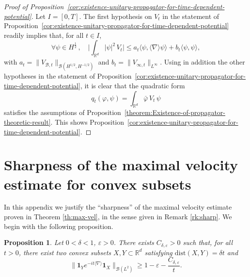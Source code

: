 \documentclass[12pt]{article}
\newcommand{\R}{\mathbb{R}}
\newcommand{\jnabla}{{\langle\nabla\rangle}}
\theoremstyle{plain}
\newtheorem{prop}[theo]{Proposition}
\begin{document}
\begin{proof}[Proof of Proposition~\ref{cor:existence-unitary-propagator-for-time-dependent-potential}]Let $I=[0,T]$. 
 The first hypothesis on $V_t$ in the statement of Proposition~\ref{cor:existence-unitary-propagator-for-time-dependent-potential} readily implies that, for all $t\in I$,
    \begin{equation}\label{eqn:condition-kato-reillich}
        \forall\psi\in H^{\frac12}\,, \quad \Big|\int_{\mathbb{R}^d} |\psi|^2  \, V_t \Big| \leq a_t\big\langle \psi, \jnabla\psi\big\rangle+b_t\langle\psi,\psi\rangle,
    \end{equation}
    with $a_t=\|V_{\mathcal{B},t}\|_{\mathcal{B}(H^{1/2},H^{-1/2})}$ and $b_t=\|V_{\infty,t}\|_{L^\infty}$. 
    Using in addition the other hypotheses in the statement of Proposition~\ref{cor:existence-unitary-propagator-for-time-dependent-potential}, it is clear that the quadratic form
    \begin{equation}
        q_t(\varphi,\psi)=\int_{\mathbb{R}^d} \bar\varphi \, V_t \, \psi
    \end{equation}
    satisfies the assumptions of Proposition~\ref{theorem:Existence-of-propagator-theoretic-result}. This shows Proposition~\ref{cor:existence-unitary-propagator-for-time-dependent-potential}.
\end{proof}

 

\appendix

\section{Sharpness of the maximal velocity estimate for convex subsets}\label{app:sharp}
In this appendix we justify the ``sharpness'' of the maximal velocity estimate proven in Theorem \ref{th:max-vel}, in the sense given in Remark \ref{rk:sharp}. We begin with the following proposition.
\begin{prop}\label{prop:sharp}
Let $0<\delta<1$, $\varepsilon>0$. There exists $C_{\delta,\varepsilon}>0$ such that, for all $t>0$, there exist two convex subsets $X,Y\subset\R^d$ satisfying $\mathrm{dist}(X,Y)=\delta t$ and
\begin{equation*}
    \big\|\mathbf{1}_Y e^{-it\langle\nabla\rangle}\mathbf{1}_X\big\|_{\mathcal{B}(L^2)}\ge 1-\varepsilon-\frac{C_{\delta,\varepsilon}}{t}.
\end{equation*}
\end{prop}
\end{document}
